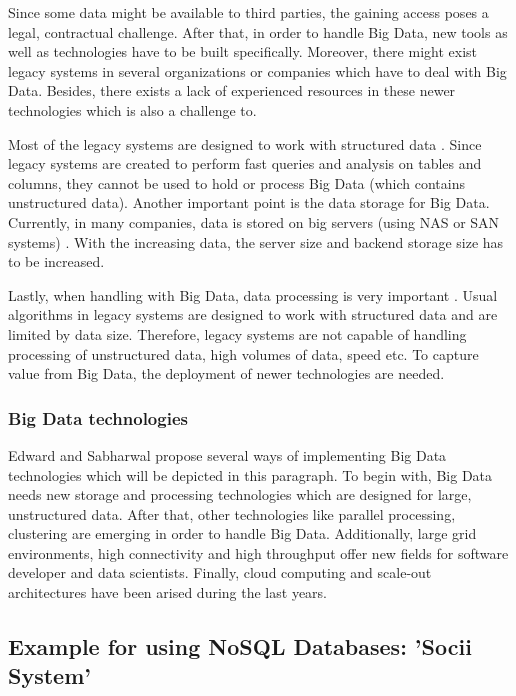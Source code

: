 Since some data might be available to third parties, the gaining access poses a legal, contractual challenge. After that, in order to handle Big Data, new tools as well as technologies have to be built specifically. Moreover, there might exist legacy systems in several organizations or companies which have to deal with Big Data. Besides, there exists a lack of experienced resources in these newer technologies which is also a challenge to.

Most of the legacy systems are designed to work with structured data \cite[p.11 ff.]{mongodb_edward}. Since legacy systems are created to perform fast queries and analysis on tables and columns, they cannot be used to hold or process Big Data (which contains unstructured data). Another important point is the data storage for Big Data. Currently, in many companies, data is stored on big servers (using \ac{NAS} or \ac{SAN} systems) \cite[p.11 ff.]{mongodb_edward}. With the increasing data, the server size and backend storage size has to be increased. 

Lastly, when handling with Big Data, data processing is very important . Usual algorithms in legacy systems are designed to work with structured data and are limited by data size. Therefore, legacy systems are not capable of handling processing of unstructured data, high volumes of data, speed etc. To capture value from Big Data, the deployment of newer technologies are needed. 

\subsubsection{Big Data technologies}

Edward and Sabharwal propose several ways of implementing Big Data technologies \cite[p.12 ff.]{mongodb_edward} which will be depicted in this paragraph. To begin with, Big Data needs new storage and processing technologies which are designed for large, unstructured data. After that, other technologies like parallel processing, clustering are emerging in order to handle Big Data. Additionally, large grid environments, high connectivity and high throughput offer new fields for software developer and data scientists. Finally, cloud computing and scale-out architectures have been arised during the last years.

\subsection{Example for using NoSQL Databases: 'Socii System'} \label{socii}

